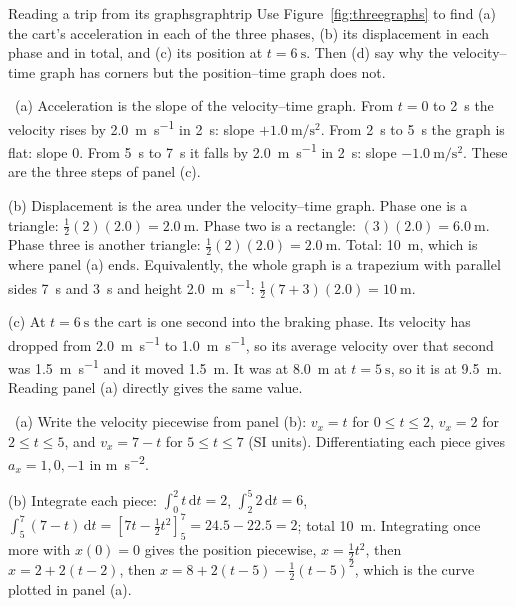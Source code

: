 \documentclass[11pt,twoside,openany]{book}
\newcommand{\dd}{\mathrm{d}}
\newcommand{\viewtag}[3]{\fcolorbox{#2}{#3}{\footnotesize\textbf{\textcolor{#2}{#1}}}}
\newcommand{\elemtag}{\viewtag{Elementary}{elemcol}{elempale}}
\newcommand{\calctag}{\viewtag{Calculus}{calccol}{calcpale}}
\newcommand{\elem}{\par\medskip\noindent\elemtag\ }
\newcommand{\calc}{\par\medskip\noindent\calctag\ }
\begin{document}
\begin{example}{Reading a trip from its graphs}{graphtrip}
Use Figure~\ref{fig:threegraphs} to find (a) the cart's acceleration in each of the three phases, (b) its displacement in each phase and in total, and (c) its position at $t = \SI{6}{\second}$. Then (d) say why the velocity--time graph has corners but the position--time graph does not.

\elem (a) Acceleration is the slope of the velocity--time graph. From $t = 0$ to \SI{2}{\second} the velocity rises by \SI{2.0}{\metre\per\second} in \SI{2}{\second}: slope $+\SI{1.0}{\metre\per\second\squared}$. From \SI{2}{\second} to \SI{5}{\second} the graph is flat: slope $0$. From \SI{5}{\second} to \SI{7}{\second} it falls by \SI{2.0}{\metre\per\second} in \SI{2}{\second}: slope $\SI{-1.0}{\metre\per\second\squared}$. These are the three steps of panel (c).

(b) Displacement is the area under the velocity--time graph. Phase one is a triangle: $\tfrac12 (2)(2.0) = \SI{2.0}{\metre}$. Phase two is a rectangle: $(3)(2.0) = \SI{6.0}{\metre}$. Phase three is another triangle: $\tfrac12 (2)(2.0) = \SI{2.0}{\metre}$. Total: \SI{10}{\metre}, which is where panel (a) ends. Equivalently, the whole graph is a trapezium with parallel sides \SI{7}{\second} and \SI{3}{\second} and height \SI{2.0}{\metre\per\second}: $\tfrac12(7 + 3)(2.0) = \SI{10}{\metre}$.

(c) At $t = \SI{6}{\second}$ the cart is one second into the braking phase. Its velocity has dropped from \SI{2.0}{\metre\per\second} to \SI{1.0}{\metre\per\second}, so its average velocity over that second was \SI{1.5}{\metre\per\second} and it moved \SI{1.5}{\metre}. It was at \SI{8.0}{\metre} at $t = \SI{5}{\second}$, so it is at \SI{9.5}{\metre}. Reading panel (a) directly gives the same value.

\calc (a) Write the velocity piecewise from panel (b): $v_x = t$ for $0 \le t \le 2$, $v_x = 2$ for $2 \le t \le 5$, and $v_x = 7 - t$ for $5 \le t \le 7$ (SI units). Differentiating each piece gives $a_x = 1, 0, -1$ in \si{\metre\per\second\squared}.

(b) Integrate each piece: $\int_0^2 t\,\dd t = 2$, $\int_2^5 2\,\dd t = 6$, $\int_5^7 (7 - t)\,\dd t = [7t - \tfrac12 t^2]_5^7 = 24.5 - 22.5 = 2$; total \SI{10}{\metre}. Integrating once more with $x(0) = 0$ gives the position piecewise, $x = \tfrac12 t^2$, then $x = 2 + 2(t - 2)$, then $x = 8 + 2(t - 5) - \tfrac12 (t - 5)^2$, which is the curve plotted in panel (a).


\end{example}
\end{document}
